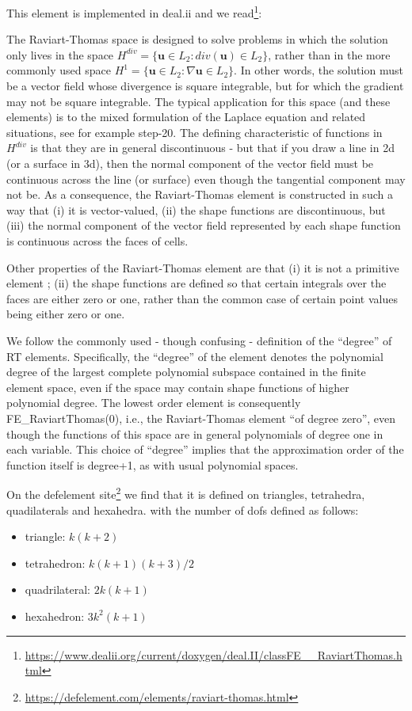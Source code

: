 This element is implemented in deal.ii and we 
read\footnote{\url{https://www.dealii.org/current/doxygen/deal.II/classFE__RaviartThomas.html}}:
\begin{displayquote}
{\color{darkgray}
The Raviart-Thomas space is designed to solve problems in which the solution only 
lives in the space $H^{div}=\{ {\bm u} \in L_2 :div({\bm u}) \in L_2\}$, 
rather than in the more commonly used space $H^1=\{ {\bm u} \in L_2 : \nabla {\bm u} \in L_2 \}$. 
In other words, the solution must be a vector field whose divergence is square integrable, 
but for which the gradient may not be square integrable. The typical application for this space 
(and these elements) is to the mixed formulation of the Laplace equation and related situations, 
see for example step-20. The defining characteristic of functions in  $H^{div}$ is that they are 
in general discontinuous - but that if you draw a line in 2d (or a surface in 3d), 
then the normal component of the vector field must be continuous across the line (or surface) 
even though the tangential component may not be. As a consequence, the Raviart-Thomas element 
is constructed in such a way that (i) it is vector-valued, (ii) the shape functions are 
discontinuous, but (iii) the normal component of the vector field represented by each shape 
function is continuous across the faces of cells.

Other properties of the Raviart-Thomas element are that 
(i) it is not a primitive element ; 
(ii) the shape functions are defined so that certain integrals over the faces are 
either zero or one, rather than the common case of certain point values being 
either zero or one. 

We follow the commonly used - though confusing - definition of the ``degree'' of RT elements. 
Specifically, the ``degree'' of the element denotes the polynomial degree of the 
largest complete polynomial subspace contained in the finite element space, 
even if the space may contain shape functions of higher polynomial degree. 
The lowest order element is consequently FE\_RaviartThomas(0), i.e., 
the Raviart-Thomas element ``of degree zero'', even though the functions of this space 
are in general polynomials of degree one in each variable. This choice of ``degree'' 
implies that the approximation order of the function itself is degree+1, as with usual polynomial spaces. 
}
\end{displayquote}

On the defelement site\footnote{\url{https://defelement.com/elements/raviart-thomas.html}} we find 
that it is defined on triangles, tetrahedra, quadilaterals and hexahedra.
with the number of dofs defined as follows:
\begin{itemize}
\item triangle: $k(k+2)$
\item tetrahedron: $k(k+1)(k+3)/2$
\item quadrilateral: $2k(k+1)$
\item hexahedron: $3k^2(k+1)$
\end{itemize}



